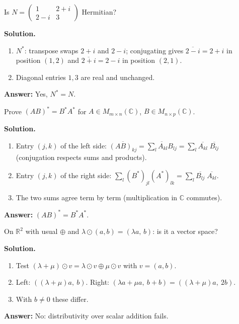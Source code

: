 \documentclass[11pt]{article}
\begin{document}
\begin{tcolorbox}[colback=white,colframe=ink!60,title={\bfseries Example 4 \textperiodcentered\ Hermitian test}]Is $N=\begin{pmatrix}1&2+i\\2-i&3\end{pmatrix}$ Hermitian?
\par\smallskip
\textbf{Solution.} \begin{enumerate}[leftmargin=1.6em,itemsep=1pt,topsep=2pt,label=\arabic*.]\item $N^{*}$: transpose swaps $2+i$ and $2-i$; conjugating gives $\overline{2-i}=2+i$ in position $(1,2)$ and $\overline{2+i}=2-i$ in position $(2,1)$.
\item Diagonal entries $1,3$ are real and unchanged.
\end{enumerate}\textbf{Answer:} Yes, $N^{*}=N$.
\end{tcolorbox}
\begin{tcolorbox}[colback=white,colframe=ink!60,title={\bfseries Example 5 \textperiodcentered\ Proof: $(AB)^{*}=B^{*}A^{*}$}]Prove $(AB)^{*}=B^{*}A^{*}$ for $A\in M_{m\times n}(\mathbb{C})$, $B\in M_{n\times p}(\mathbb{C})$.
\par\smallskip
\textbf{Solution.} \begin{enumerate}[leftmargin=1.6em,itemsep=1pt,topsep=2pt,label=\arabic*.]\item Entry $(j,k)$ of the left side: $\overline{(AB)_{kj}}=\overline{\sum_{l}A_{kl}B_{lj}}=\sum_{l}\overline{A_{kl}}\;\overline{B_{lj}}$ (conjugation respects sums and products).
\item Entry $(j,k)$ of the right side: $\sum_{l}(B^{*})_{jl}(A^{*})_{lk}=\sum_{l}\overline{B_{lj}}\;\overline{A_{kl}}$.
\item The two sums agree term by term (multiplication in $\mathbb{C}$ commutes).
\end{enumerate}\textbf{Answer:} $(AB)^{*}=B^{*}A^{*}$.
\end{tcolorbox}
\begin{tcolorbox}[colback=white,colframe=ink!60,title={\bfseries Example 6 \textperiodcentered\ Axiom failure}]On $\mathbb{R}^{2}$ with usual $\oplus$ and $\lambda\odot(a,b)=(\lambda a,\,b)$: is it a vector space?
\par\smallskip
\textbf{Solution.} \begin{enumerate}[leftmargin=1.6em,itemsep=1pt,topsep=2pt,label=\arabic*.]\item Test $(\lambda+\mu)\odot v=\lambda\odot v\oplus\mu\odot v$ with $v=(a,b)$.
\item Left: $((\lambda+\mu)a,\ b)$. Right: $(\lambda a+\mu a,\ b+b)=((\lambda+\mu)a,\ 2b)$.
\item With $b\neq0$ these differ.
\end{enumerate}\textbf{Answer:} No: distributivity over scalar addition fails.
\end{tcolorbox}
\end{document}
